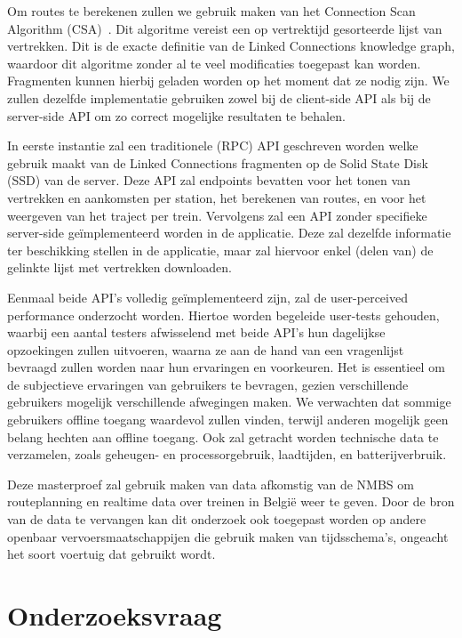 Om routes te berekenen zullen we gebruik maken van het Connection Scan Algorithm (CSA)~\citep{strasser13,strasser14,strasser17}. Dit algoritme vereist een op vertrektijd gesorteerde lijst van vertrekken. Dit is de exacte definitie van de Linked Connections knowledge graph, waardoor dit algoritme zonder al te veel modificaties toegepast kan worden. Fragmenten kunnen hierbij geladen worden op het moment dat ze nodig zijn. We zullen dezelfde implementatie gebruiken zowel bij de client-side API als bij de server-side API om zo correct mogelijke resultaten te behalen. 

In eerste instantie zal een traditionele (RPC) API geschreven worden welke gebruik maakt van de Linked Connections fragmenten op de Solid State Disk (SSD) van de server. Deze API zal endpoints bevatten voor het tonen van vertrekken en aankomsten per station, het berekenen van routes, en voor het weergeven van het traject per trein. 
Vervolgens zal een API zonder specifieke server-side geïmplementeerd worden in de applicatie. Deze zal dezelfde informatie ter beschikking stellen in de applicatie, maar zal hiervoor enkel (delen van) de gelinkte lijst met vertrekken downloaden. 

Eenmaal beide API's volledig geïmplementeerd zijn, zal de user-perceived performance onderzocht worden. Hiertoe worden begeleide user-tests gehouden, waarbij een aantal testers afwisselend met beide API's hun dagelijkse opzoekingen zullen uitvoeren, waarna ze aan de hand van een vragenlijst bevraagd zullen worden naar hun ervaringen en voorkeuren. Het is essentieel om de subjectieve ervaringen van gebruikers te bevragen, gezien verschillende gebruikers mogelijk verschillende afwegingen maken. We verwachten dat sommige gebruikers offline toegang waardevol zullen vinden, terwijl anderen mogelijk geen belang hechten aan offline toegang. Ook zal getracht worden technische data te verzamelen, zoals geheugen- en processorgebruik, laadtijden, en batterijverbruik. 

Deze masterproef zal gebruik maken van data afkomstig van de NMBS om routeplanning en realtime data over treinen in België weer te geven. Door de bron van de data te vervangen kan dit onderzoek ook toegepast worden op andere openbaar vervoersmaatschappijen die gebruik maken van tijdsschema's, ongeacht het soort voertuig dat gebruikt wordt.

\section{Onderzoeksvraag}
\label{sec:onderzoeksvraag}
 
